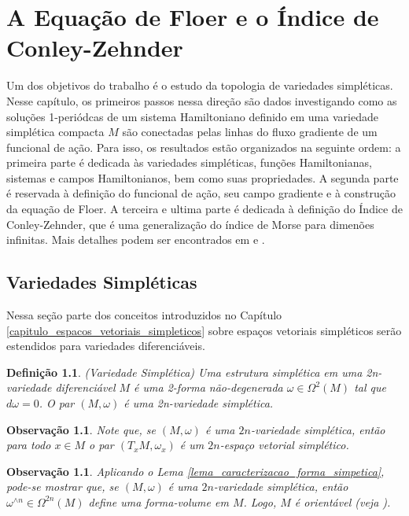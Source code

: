 \documentclass[12pt]{book}
\newtheorem{definicao}[teorema]{Definição}
\newtheorem{observacao}[teorema]{Observação}
\begin{document}
	\chapter{A Equação de Floer e o Índice de Conley-Zehnder}\label{capitulo_equacao_floer}
	
	Um dos objetivos do trabalho é o estudo da topologia de variedades simpléticas. Nesse capítulo, os primeiros passos nessa direção são dados investigando como as soluções 1-periódcas de um sistema Hamiltoniano definido em uma variedade simplética compacta $M$ são conectadas pelas linhas do fluxo gradiente de um funcional de ação. Para isso, os resultados estão organizados na seguinte ordem: a primeira parte é dedicada às variedades simpléticas, funções Hamiltonianas, sistemas e campos Hamiltonianos, bem como suas propriedades. A segunda parte é reservada à definição do funcional de ação, seu campo gradiente e à construção da equação de Floer. A terceira e ultima parte é dedicada à definição do Índice de Conley-Zehnder, que é uma generalização do índice de Morse para dimenões infinitas. Mais detalhes podem ser encontrados em \cite{audi_floer_homology} e \cite{salamon_zehnder}.
	
	
	
	
	\section{Variedades Simpléticas}\label{secao_variedade_simpletica}
	
	Nessa seção parte dos conceitos introduzidos no Capítulo \ref{capitulo_espacos_vetoriais_simpleticos} sobre espaços vetoriais simpléticos serão estendidos para variedades diferenciáveis.
	
	\begin{definicao}
		(Variedade Simplética) Uma estrutura simplética em uma 2n-variedade diferenciável $M$ é uma 2-forma não-degenerada $\omega\in \Omega^{2}(M)$ tal que $d\omega=0$. O par $(M, \omega)$ é uma 2n-variedade simplética.
	\end{definicao}
	
	\begin{observacao}
		Note que, se $(M, \omega)$ é uma $2n$-variedade simplética, então para todo $x \in M$ o par $(T_{x}M, \omega_{x})$ é um $2n$-espaço vetorial simplético.
	\end{observacao}
	
	\begin{observacao}
		Aplicando o Lema \ref{lema_caracterizacao_forma_simpetica}, pode-se mostrar que, se $(M, \omega)$ é uma $2n$-variedade simplética, então $\omega^{\wedge n} \in \Omega^{2n}(M)$ define uma forma-volume em $M$. Logo, $M$ é orientável (veja \cite{warner_manifolds}).
	\end{observacao}
	
\end{document}
